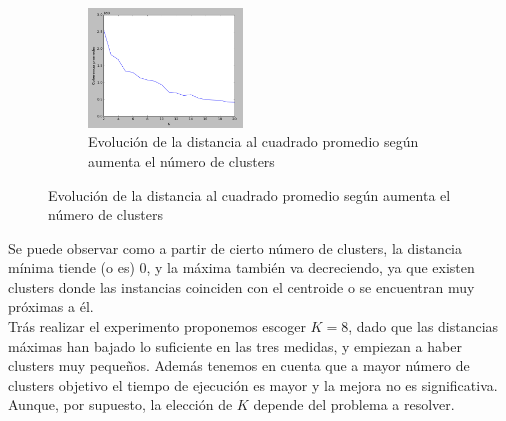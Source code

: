 \documentclass[11pt,a4paper]{article}
\begin{document}
\begin{figure}[h]
\begin{subfigure}{\textwidth}
  \centering
    \includegraphics[width=0.45\textwidth]{img/figure_P.png}
    \caption{Evolución de la distancia al cuadrado promedio según aumenta el número de clusters}
    \label{fig:promedio}
  \end{subfigure}

\end{figure}





Se puede observar como a partir de cierto número de clusters, la distancia
mínima tiende (o es) 0, y la máxima también va decreciendo, ya que existen
clusters donde las instancias coinciden con el centroide o se
encuentran muy próximas a él. \\

Trás realizar el experimento proponemos escoger $K = 8$, dado que las
distancias máximas han bajado lo suficiente en las tres medidas, y
empiezan a haber clusters muy  pequeños. Además tenemos en cuenta que
a mayor número de clusters objetivo el tiempo de ejecución es mayor y
la mejora no es significativa. Aunque, por supuesto, la elección de
$K$ depende del problema a resolver.
\end{document}
